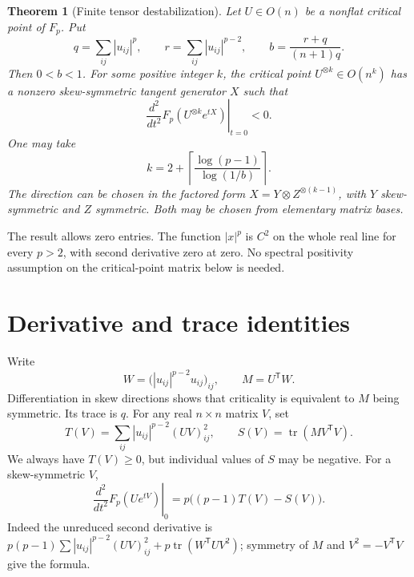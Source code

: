 \documentclass[11pt]{article}
\newtheorem{theorem}{Theorem}[section]
\newcommand{\tr}{\operatorname{tr}}
\begin{document}
\begin{theorem}[Finite tensor destabilization]\label{thm:main}
Let $U\in O(n)$ be a nonflat critical point of $F_p$. Put
\[
 q=\sum_{ij}|u_{ij}|^p,\qquad
 r=\sum_{ij}|u_{ij}|^{p-2},\qquad
 b=\frac{r+q}{(n+1)q}.
\]
Then $0<b<1$. For some positive integer $k$, the critical point
$U^{\otimes k}\in O(n^k)$ has a nonzero skew-symmetric tangent
generator $X$ such that
\[
 \left.\frac{d^2}{dt^2}F_p(U^{\otimes k}e^{tX})\right|_{t=0}<0.
\]
One may take
\begin{equation}\label{eq:kbound}
 k=2+\left\lceil\frac{\log(p-1)}{\log(1/b)}\right\rceil.
\end{equation}
The direction can be chosen in the factored form
$X=Y\otimes Z^{\otimes(k-1)}$, with $Y$ skew-symmetric and $Z$
symmetric. Both may be chosen from elementary matrix bases.
\end{theorem}

The result allows zero entries. The function $|x|^p$ is $C^2$ on the
whole real line for every $p>2$, with second derivative zero at zero.
No spectral positivity assumption on the critical-point matrix below
is needed.

\section{Derivative and trace identities}
Write
\[
 W=\bigl(|u_{ij}|^{p-2}u_{ij}\bigr)_{ij},\qquad M=U^{\mathsf T}W.
\]
Differentiation in skew directions shows that criticality is equivalent
to $M$ being symmetric. Its trace is $q$.
For any real $n\times n$ matrix $V$, set
\[
 T(V)=\sum_{ij}|u_{ij}|^{p-2}(UV)_{ij}^2,\qquad
 S(V)=\tr(M V^{\mathsf T}V).
\]
We always have $T(V)\ge0$, but individual values of $S$ may be negative.
For a skew-symmetric $V$,
\begin{equation}\label{eq:hessian}
 \left.\frac{d^2}{dt^2}F_p(Ue^{tV})\right|_0
 =p\bigl((p-1)T(V)-S(V)\bigr).
\end{equation}
Indeed the unreduced second derivative is
$p(p-1)\sum |u_{ij}|^{p-2}(UV)_{ij}^2+
p\tr(W^{\mathsf T}UV^2)$; symmetry of $M$ and
$V^2=-V^{\mathsf T}V$ give the formula.
\end{document}
